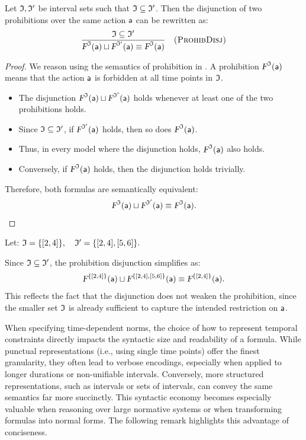 \begin{lemma}\label{redunprohib}
Let $\mathfrak{I}, \mathfrak{I}'$ be interval sets such that $\mathfrak{I} \subseteq \mathfrak{I}'$. Then the disjunction of two prohibitions over the same action $\mathsf{a} $ can be rewritten as:
\[
\frac{
  \mathfrak{I} \subseteq \mathfrak{I}'
}{
  \textsl{F}^{\mathfrak{I}}(\mathsf{a}) \sqcup \textsl{F}^{\mathfrak{I}'}(\mathsf{a}) \equiv  \textsl{F}^{\mathfrak{I}}(\mathsf{a})
}
\quad \textsc{(ProhibDisj)}
\]
\end{lemma}

\begin{proof}
We reason using the semantics of prohibition in \TDDLfm. A prohibition $\textsl{F}^{\mathfrak{I}}(\mathsf{a})$ means that the action $\mathsf{a} $ is forbidden at all time points in $\mathfrak{I}$.
\begin{itemize}
    \item The disjunction $\textsl{F}^{\mathfrak{I}}(\mathsf{a}) \sqcup \textsl{F}^{\mathfrak{I}'}(\mathsf{a})$ holds whenever at least one of the two prohibitions holds.
    \item Since $\mathfrak{I} \subseteq \mathfrak{I}'$, if $\textsl{F}^{\mathfrak{I}'}(\mathsf{a})$ holds, then so does $\textsl{F}^{\mathfrak{I}}(\mathsf{a})$.
    \item Thus, in every model where the disjunction holds, $\textsl{F}^{\mathfrak{I}}(\mathsf{a})$ also holds.
    \item Conversely, if $\textsl{F}^{\mathfrak{I}}(\mathsf{a})$ holds, then the disjunction holds trivially.
\end{itemize}

Therefore, both formulas are semantically equivalent:
\[
\textsl{F}^{\mathfrak{I}}(\mathsf{a}) \sqcup \textsl{F}^{\mathfrak{I}'}(\mathsf{a}) \equiv \textsl{F}^{\mathfrak{I}}(\mathsf{a}).
\]
\end{proof}

\begin{example}
Let: $\mathfrak{I} = \{[2,4]\}, \quad \mathfrak{I}' = \{[2,4], [5,6]\}.$

Since $\mathfrak{I} \subseteq \mathfrak{I}'$, the prohibition disjunction simplifies as:
\[
\textsl{F}^{\{[2,4]\}}(\mathsf{a}) \sqcup \textsl{F}^{\{[2,4],[5,6]\}}(\mathsf{a}) \equiv  \textsl{F}^{\{[2,4]\}}(\mathsf{a}).
\]
This reflects the fact that the disjunction does not weaken the prohibition, since the smaller set $\mathfrak{I}$ is already sufficient to capture the intended restriction on $\mathsf{a} $.
\end{example}

When specifying time-dependent norms, the choice of how to represent temporal constraints directly impacts the syntactic size and readability of a formula. While punctual representations (i.e., using single time points) offer the finest granularity, they often lead to verbose encodings, especially when applied to longer durations or non-unifiable intervals. Conversely, more structured representations, such as intervals or sets of intervals, can convey the same semantics far more succinctly. This syntactic economy becomes especially valuable when reasoning over large normative systems or when transforming formulas into normal forms. The following remark highlights this advantage of conciseness.

